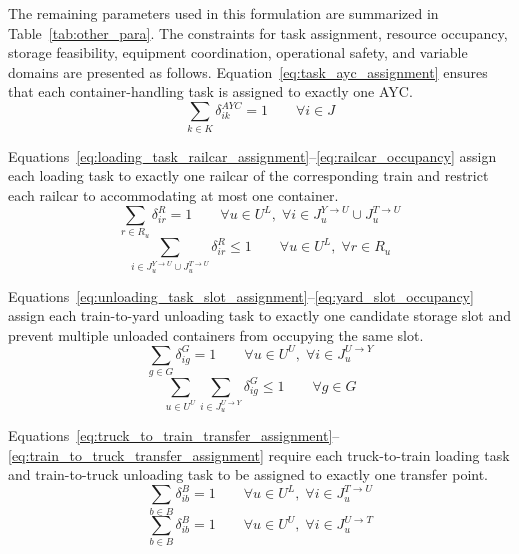 The remaining parameters used in this formulation are summarized in Table~\ref{tab:other_para}. 
The constraints for task assignment, resource occupancy, storage feasibility, equipment coordination, operational safety, and variable domains are presented as follows.
Equation~\ref{eq:task_ayc_assignment} ensures that each container-handling task is assigned to exactly one AYC.
\begin{equation}
\label{eq:task_ayc_assignment}
\sum_{k\in K}\delta_{ik}^{AYC}=1
\qquad
\forall i\in J
\end{equation}

Equations~\ref{eq:loading_task_railcar_assignment}--\ref{eq:railcar_occupancy} assign each loading task to exactly one railcar of the corresponding train and restrict each railcar to accommodating at most one container.
\begin{equation}
\label{eq:loading_task_railcar_assignment}
\sum_{r\in R_u}\delta_{ir}^{R}=1
\qquad
\forall u\in U^{L},\;
\forall i\in
J_u^{Y\rightarrow U}\cup J_u^{T\rightarrow U}
\end{equation}
\begin{equation}
\label{eq:railcar_occupancy}
\sum_{i\in J_u^{Y\rightarrow U}\cup J_u^{T\rightarrow U}}
\delta_{ir}^{R}
\leq 1
\qquad
\forall u\in U^{L},\;
\forall r\in R_u
\end{equation}

Equations~\ref{eq:unloading_task_slot_assignment}--\ref{eq:yard_slot_occupancy} assign each train-to-yard unloading task to exactly one candidate storage slot and prevent multiple unloaded containers from occupying the same slot.
\begin{equation}
\label{eq:unloading_task_slot_assignment}
\sum_{g\in G}\delta_{ig}^{G}=1
\qquad
\forall u\in U^{U},\;
\forall i\in J_u^{U\rightarrow Y}
\end{equation}
\begin{equation}
\label{eq:yard_slot_occupancy}
\sum_{u\in U^{U}}
\sum_{i\in J_u^{U\rightarrow Y}}
\delta_{ig}^{G}
\leq 1
\qquad
\forall g\in G
\end{equation}

Equations~\ref{eq:truck_to_train_transfer_assignment}--\ref{eq:train_to_truck_transfer_assignment} require each truck-to-train loading task and train-to-truck unloading task to be assigned to exactly one transfer point.
\begin{equation}
\label{eq:truck_to_train_transfer_assignment}
\sum_{b\in B}\delta_{ib}^{B}=1
\qquad
\forall u\in U^{L},\;
\forall i\in J_u^{T\rightarrow U}
\end{equation}
\begin{equation}
\label{eq:train_to_truck_transfer_assignment}
\sum_{b\in B}\delta_{ib}^{B}=1
\qquad
\forall u\in U^{U},\;
\forall i\in J_u^{U\rightarrow T}
\end{equation}

